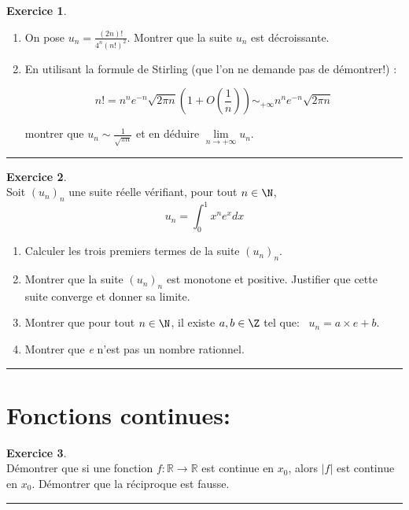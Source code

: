 \documentclass[a4paper,11pt]{article}
\theoremstyle{definition}
\newtheorem{exo}{Exercice} %
\begin{document}
		\begin{exo}\textit{}\quad\\[-0.25cm]
			\begin{enumerate}
				\item On pose $u_{n}=\frac{(2 n) !}{4^{n}(n !)^{2}}$. Montrer que la suite $u_{n}$ est décroissante.
				\item  En utilisant la formule de Stirling (que l'on ne demande pas de démontrer!) :
				
				$$
				n !=n^{n} e^{-n} \sqrt{2 \pi n}\left(1+O\left(\frac{1}{n}\right)\right) \sim_{+\infty} n^{n} e^{-n} \sqrt{2 \pi n}
				$$
				
				montrer que $u_{n} \sim \frac{1}{\sqrt{\pi n}}$ et en déduire $\lim\limits_{n\rightarrow +\infty} u_{n}$.
			\end{enumerate}

	
	\centering
	\rule{1\linewidth}{0.6pt}
\end{exo}

		\begin{exo}\textit{}\quad\\[0.25cm]
	Soit $(u_n )_n$ une suite réelle vérifiant, pour tout $n \in \N$,
$$ u_n = \int_{0}^{1} x^ne^xdx$$ 

\begin{enumerate}
	\item Calculer les trois premiers termes de la suite  $(u_n )_n$.
	\item Montrer que la suite $(u_n )_n$ est monotone et positive. Justifier que cette suite converge et donner sa limite.  
	\item Montrer que pour tout $n\in\N$, il existe $a,b\in \Z$ tel que: \ $u_n = a\times e +b$.
	\item Montrer que \emph{e} n'est pas un nombre rationnel.
\end{enumerate}
	
	\centering
	\rule{1\linewidth}{0.6pt}
\end{exo}
\newpage
\section*{Fonctions continues:}		
	

\begin{exo}\textit{}\quad\\[0.25cm]
	Démontrer que si une fonction $f:\mathbb R\to\mathbb R$ est continue en $x_0$, alors $|f|$ est continue en $x_0$. Démontrer que la réciproque est fausse.
	
	
	\centering
	\rule{1\linewidth}{0.6pt}
\end{exo}
\end{document}
